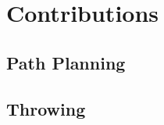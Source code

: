 \section{Contributions}
\subsection{Path Planning}\label{sec:srm}
%
%



\subsection{Throwing}
%



%
%
%
